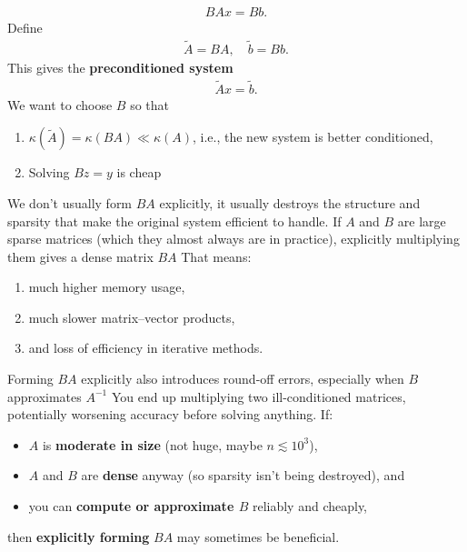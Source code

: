 \documentclass{report}
\begin{document}
\begin{itemize}
\begin{align*}
                BAx = Bb
            .\end{align*}
            Define
            \begin{align*}
                \tilde{A} = BA, \quad \tilde{b} = Bb
            .\end{align*}
            This gives the \textbf{preconditioned system}
            \begin{align*}
                \tilde{A}x = \tilde{b}
            .\end{align*}
            We want to choose $B$ so that
            \begin{enumerate}
                \item $\kappa(\tilde{A}) = \kappa(BA) \ll \kappa(A) $, i.e., the new system is better conditioned,
                \item Solving $Bz = y $ is cheap 
            \end{enumerate}
            We don't usually form $BA$ explicitly, it usually destroys the structure and sparsity that make the original system efficient to handle.
            \bigbreak \noindent 
            If $A$ and $B$ are large sparse matrices (which they almost always are in practice), explicitly multiplying them gives a dense matrix $BA$
            \bigbreak \noindent 
            That means:
            \begin{enumerate}
                \item much higher memory usage,
                \item much slower matrix–vector products,
                \item and loss of efficiency in iterative methods.
            \end{enumerate}
            Forming $BA$ explicitly also introduces round-off errors, especially when $B$ approximates $A^{-1}$ You end up multiplying two ill-conditioned matrices, potentially worsening accuracy before solving anything.
            \bigbreak \noindent 
            If:
            \begin{itemize}
                \item $A$ is \textbf{moderate in size} (not huge, maybe $n \lesssim 10^{3}$),
                \item $A$ and $B$ are \textbf{dense} anyway (so sparsity isn’t being destroyed), and
                \item you can \textbf{compute or approximate $B$} reliably and cheaply,
            \end{itemize}
            then \textbf{explicitly forming} $BA$ may sometimes be beneficial.

\end{itemize}
\end{document}
